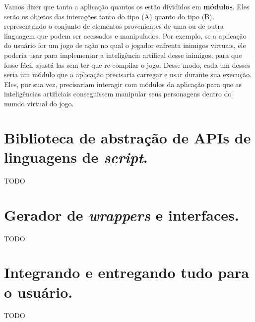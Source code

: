     Vamos dizer que tanto a aplicação quantos os  estão divididos
    em \textbf{módulos}. Eles serão os objetos das interações tanto do tipo (A)
    quanto do tipo (B), representando o conjunto de elementos provenientes de
    uma ou de outra linguagem que podem ser acessados e manipulados. Por
    exemplo, se a aplicação do usuário for um jogo de ação no qual o jogador
    enfrenta inimigos virtuais, ele poderia usar  para implementar a
    inteligência artifical desse inimigos, para que fosse fácil ajustá-las sem
    ter que re-compilar o jogo. Desse modo, cada um desses  seria um
    módulo que a aplicação precisaria carregar e usar durante sua execução.
    Eles, por sua vez, precisariam interagir com módulos da aplicação para que
    as inteligências artificiais conseguissem manipular seus personagens dentro
    do mundo virtual do jogo.

  \section{Biblioteca de abstração de APIs de linguagens de \emph{script}.}
  \label{sec:estrutura:opa}
  TODO
  
  \section{Gerador de \emph{wrappers} e interfaces.}
  \label{sec:estrutura:opwig}
  TODO
  
  \section{Integrando e entregando tudo para o usuário.}
  \label{sec:estrutura:integration}
  TODO
